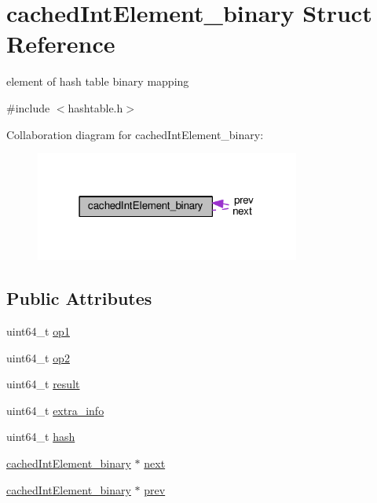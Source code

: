 \hypertarget{structcachedIntElement__binary}{}\section{cached\+Int\+Element\+\_\+binary Struct Reference}
\label{structcachedIntElement__binary}


element of hash table binary mapping  




{\ttfamily \#include $<$hashtable.\+h$>$}



Collaboration diagram for cached\+Int\+Element\+\_\+binary\+:\nopagebreak
\begin{figure}[H]
\begin{center}
\leavevmode
\includegraphics[width=247pt]{structcachedIntElement__binary__coll__graph}
\end{center}
\end{figure}
\subsection*{Public Attributes}
\begin{DoxyCompactItemize}
\item 
uint64\+\_\+t \hyperlink{structcachedIntElement__binary_aa4305da16240730699f33560c0f5aef0}{op1}
\item 
uint64\+\_\+t \hyperlink{structcachedIntElement__binary_aff3a2ddce9bbb4e3e9c8621da7f23799}{op2}
\item 
uint64\+\_\+t \hyperlink{structcachedIntElement__binary_a44ef9752977222f618137d8c1d6d4159}{result}
\item 
uint64\+\_\+t \hyperlink{structcachedIntElement__binary_a61b3637cb5d56531c17cc07aff0b8f84}{extra\+\_\+info}
\item 
uint64\+\_\+t \hyperlink{structcachedIntElement__binary_ad9d23892ecafef09a352699e01aebecc}{hash}
\item 
\hyperlink{structcachedIntElement__binary}{cached\+Int\+Element\+\_\+binary} $\ast$ \hyperlink{structcachedIntElement__binary_a500da0d9af2a1138003bf6b6f0c22555}{next}
\item 
\hyperlink{structcachedIntElement__binary}{cached\+Int\+Element\+\_\+binary} $\ast$ \hyperlink{structcachedIntElement__binary_ae0a95ff1f3a3062e706d06877014e8a6}{prev}
\end{DoxyCompactItemize}


